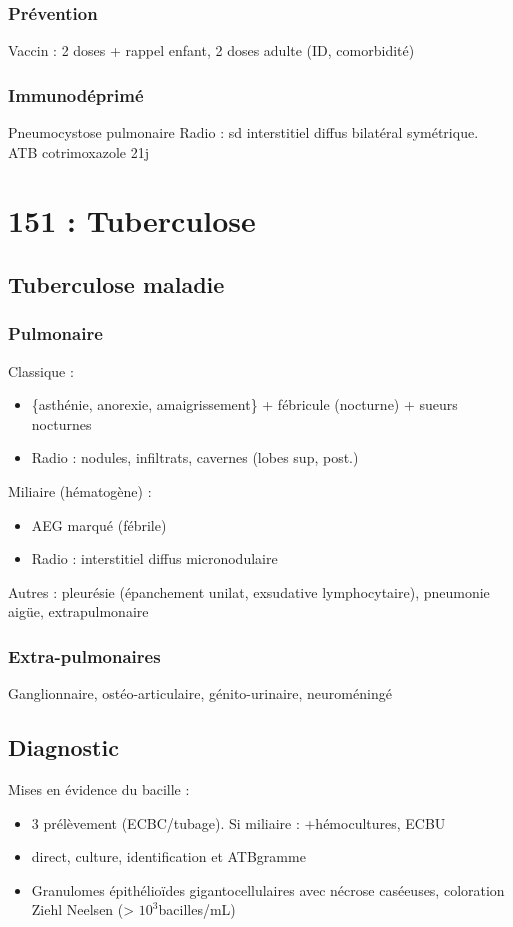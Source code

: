 \subsubsection{Prévention}
Vaccin : 2 doses + rappel enfant, 2 doses adulte (ID, comorbidité)

\subsubsection{Immunodéprimé}
Pneumocystose pulmonaire
Radio : sd interstitiel diffus bilatéral symétrique. ATB cotrimoxazole 21j


\section{151 : Tuberculose}
\subsection{Tuberculose maladie}
\subsubsection{Pulmonaire}
Classique : 
\begin{itemize}
\item \{asthénie, anorexie, amaigrissement\} + fébricule (nocturne) + sueurs nocturnes
\item Radio : nodules, infiltrats, cavernes (lobes sup, post.)
\end{itemize}
Miliaire (hématogène) :
\begin{itemize}
\item AEG marqué (fébrile)
\item Radio : interstitiel diffus micronodulaire
\end{itemize}
Autres : pleurésie (épanchement unilat, exsudative lymphocytaire), pneumonie
aigüe, extrapulmonaire
\subsubsection{Extra-pulmonaires}
Ganglionnaire, ostéo-articulaire, génito-urinaire, neuroméningé
\subsection{Diagnostic}
Mises en évidence du bacille :
\begin{itemize}
\item 3 prélèvement (ECBC/tubage). Si miliaire : +hémocultures, ECBU
\item direct, culture, identification et ATBgramme
\item Granulomes épithélioïdes gigantocellulaires avec nécrose caséeuses,
  coloration Ziehl Neelsen (> $10^3$bacilles/mL)
\end{itemize}
